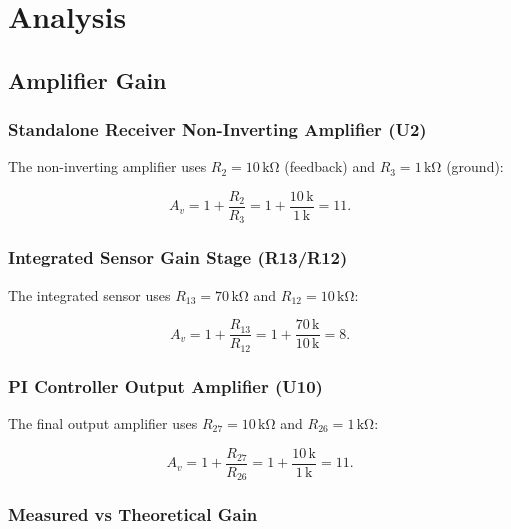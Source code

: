 \documentclass[10pt]{article}
\begin{document}

\section{Analysis}

\subsection{Amplifier Gain}

\subsubsection{Standalone Receiver Non-Inverting Amplifier (U2)}

The non-inverting amplifier uses $R_2 = 10\,\mathrm{k\Omega}$ (feedback) and $R_3 = 1\,\mathrm{k\Omega}$ (ground):

\begin{equation}
A_v = 1 + \frac{R_2}{R_3} = 1 + \frac{10\,\mathrm{k}}{1\,\mathrm{k}} = 11.
\end{equation}

\subsubsection{Integrated Sensor Gain Stage (R13/R12)}

The integrated sensor uses $R_{13} = 70\,\mathrm{k\Omega}$ and $R_{12} = 10\,\mathrm{k\Omega}$:

\begin{equation}
A_v = 1 + \frac{R_{13}}{R_{12}} = 1 + \frac{70\,\mathrm{k}}{10\,\mathrm{k}} = 8.
\end{equation}

\subsubsection{PI Controller Output Amplifier (U10)}

The final output amplifier uses $R_{27} = 10\,\mathrm{k\Omega}$ and $R_{26} = 1\,\mathrm{k\Omega}$:

\begin{equation}
A_v = 1 + \frac{R_{27}}{R_{26}} = 1 + \frac{10\,\mathrm{k}}{1\,\mathrm{k}} = 11.
\end{equation}

\subsubsection{Measured vs Theoretical Gain}
\end{document}

